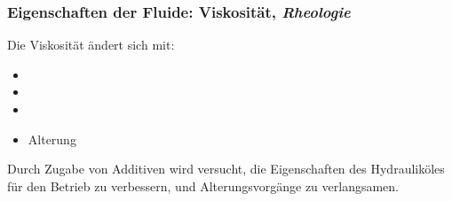 
\begin{frame}
  \frametitle{Eigenschaften der Fluide: Viskosit\"at, \emph{Rheologie}}
  Die Viskosit\"at \"andert sich mit:
  \begin{itemize}
    \item {}
    \item {}
    \item {}
    \item Alterung
  \end{itemize}
  
  Durch Zugabe von Additiven wird versucht, die Eigenschaften des Hydraulik\"oles
  f\"ur den Betrieb zu verbessern, und Alterungsvorg\"ange zu verlangsamen.

  \ifteacher%
  \else%
    \vspace*{-1.0\baselineskip}\rotatebox[origin=lB]{180}{%
    \resizebox{0.9\linewidth}{!}{\parbox[t]{3.95\linewidth}{%
  Temperatur, Druck, Geschwindigkeit
    }}}
  \fi%



\end{frame}



